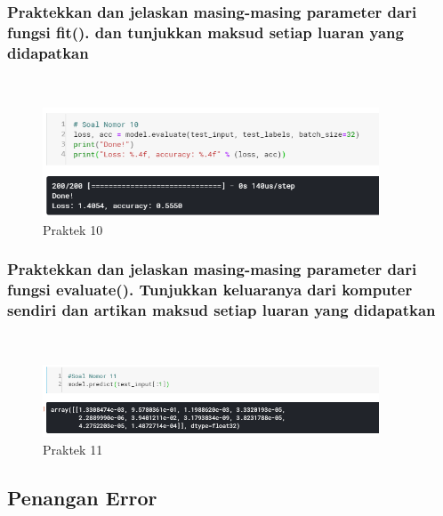 \subsubsection{Praktekkan dan jelaskan masing-masing parameter dari fungsi fit(). dan tunjukkan maksud setiap luaran yang didapatkan}
\hfill\\


	
	\begin{figure}[H]
		\begin{center}
		 \includegraphics[width=10cm]{figures/1174076/figures6/praktek10.png}
		 \caption{Praktek 10}	
		\end{center}
	\end{figure}
 
\subsubsection{Praktekkan dan jelaskan masing-masing parameter dari fungsi evaluate(). Tunjukkan keluaranya dari komputer sendiri dan artikan maksud setiap luaran yang didapatkan}
\hfill\\



	\begin{figure}[H]
		\begin{center}
		 \includegraphics[width=10cm]{figures/1174076/figures6/praktek11.png}
		 \caption{Praktek 11}	
		\end{center}
	\end{figure}
 
\subsection{Penangan Error}
	
